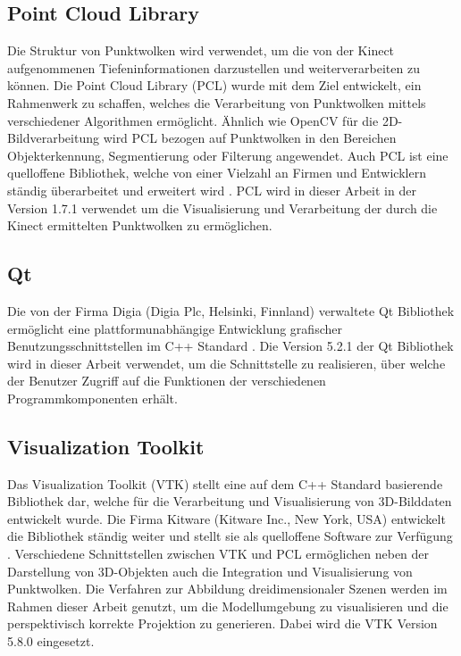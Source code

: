 
\subsection{Point Cloud Library}
Die Struktur von Punktwolken wird verwendet, um die von der Kinect aufgenommenen Tiefeninformationen darzustellen und weiterverarbeiten zu können. Die Point Cloud Library (PCL) wurde mit dem Ziel entwickelt, ein Rahmenwerk zu schaffen, welches die Verarbeitung von Punktwolken mittels verschiedener Algorithmen ermöglicht. Ähnlich wie OpenCV für die 2D-Bildverarbeitung wird PCL bezogen auf Punktwolken in den Bereichen Objekterkennung, Segmentierung oder Filterung angewendet. Auch PCL ist eine quelloffene Bibliothek, welche von einer Vielzahl an Firmen und Entwicklern ständig überarbeitet und erweitert wird \cite{PCL}. PCL wird in dieser Arbeit in der Version 1.7.1 verwendet um die Visualisierung und Verarbeitung der durch die Kinect ermittelten Punktwolken zu ermöglichen.


\subsection{Qt}
Die von der Firma Digia (Digia Plc, Helsinki, Finnland) verwaltete Qt Bibliothek ermöglicht eine plattformunabhängige Entwicklung grafischer Benutzungsschnittstellen im C++ Standard \cite{Qt}. Die Version 5.2.1 der Qt Bibliothek wird in dieser Arbeit verwendet, um die Schnittstelle zu realisieren, über welche der Benutzer Zugriff auf die Funktionen der verschiedenen Programmkomponenten erhält.

\subsection{Visualization Toolkit}
\label{chap.vtk}
Das Visualization Toolkit (VTK) stellt eine auf dem C++ Standard basierende Bibliothek dar, welche für die Verarbeitung und Visualisierung von 3D-Bilddaten entwickelt wurde. Die Firma Kitware (Kitware Inc., New York, USA) entwickelt die Bibliothek ständig weiter und stellt sie als quelloffene Software zur Verfügung \cite{VTK}. Verschiedene Schnittstellen zwischen VTK und PCL ermöglichen neben der Darstellung von 3D-Objekten auch die Integration und Visualisierung von Punktwolken. Die Verfahren zur Abbildung dreidimensionaler Szenen werden im Rahmen dieser Arbeit genutzt, um die Modellumgebung zu visualisieren und die perspektivisch korrekte Projektion zu generieren. Dabei wird die VTK Version 5.8.0 eingesetzt.

